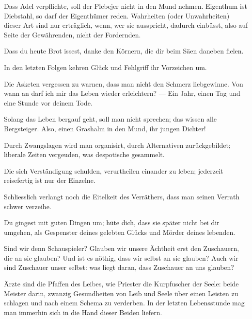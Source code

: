 Dass Adel verpflichte, soll der Plebejer nicht in den Mund nehmen. Eigenthum ist Diebstahl, so darf der Eigenthümer reden. Wahrheiten (oder Unwahrheiten) dieser Art sind nur erträglich, wenn, wer sie ausspricht, dadurch einbüsst, also auf Seite der Gewährenden, nicht der Fordernden.
\par

Dass du heute Brot issest, danke den Körnern, die dir beim Säen daneben fielen.
\par

In den letzten Folgen kehren Glück und Fehlgriff ihr Vorzeichen um.
\par

Die Asketen vergessen zu warnen, dass man nicht den Schmerz liebgewinne. Von wann an darf ich mir das Leben wieder erleichtern? — Ein Jahr, einen Tag und eine Stunde vor deinem Tode.
\par

Solang das Leben bergauf geht, soll man nicht sprechen; das wissen alle Bergsteiger. Also, einen Grashalm in den Mund, ihr jungen Dichter!
\par

Durch Zwangslagen wird man organisirt, durch Alternativen zurückgebildet; liberale Zeiten vergeuden, was despotische gesammelt.
\par

Die sich Verständigung schulden, verurtheilen einander zu leben; jederzeit reisefertig ist nur der Einzelne.
\par

Schliesslich verlangt noch die Eitelkeit des Verräthers, dass man seinen Verrath schwer verzeihe.
\par

Du gingest mit guten Dingen um; hüte dich, dass sie später nicht bei dir umgehen, als Gespenster deines gelebten Glücks und Mörder deines lebenden.
\par

Sind wir denn Schauspieler? Glauben wir unsere Ächtheit erst den Zuschauern, die an sie glauben? Und ist es nöthig, dass wir selbst an sie glauben? Auch wir sind Zuschauer unser selbst: was liegt daran, dass Zuschauer an uns glauben?
\par

Ärzte sind die Pfaffen des Leibes, wie Priester die Kurpfuscher der Seele: beide Meister darin, zwanzig Gesundheiten von Leib und Seele über einen Leisten zu schlagen und nach einem Schema zu verderben. In der letzten Lebensstunde mag man immerhin sich in die Hand dieser Beiden liefern.
\par

